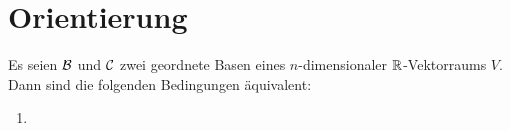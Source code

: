 \section{Orientierung}


\begin{lemma}
  Es seien $\mathcal{B}$ und $\mathcal{C}$ zwei geordnete Basen eines $n$-dimensionaler $\mathbb{R}$-Vektorraums $V$.
  Dann sind die folgenden Bedingungen äquivalent:
  \begin{enumerate}[leftmargin=*, label=\roman*)]
    \item
      
  \end{enumerate}
\end{lemma}
